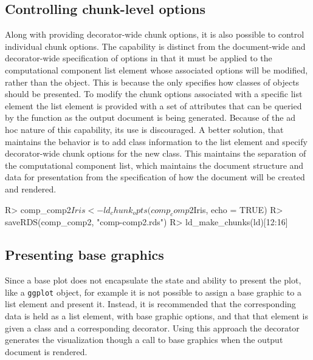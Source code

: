 \documentclass[
]{jss}
\begin{document}
\hypertarget{controlling-chunk-level-options}{%
\subsection{Controlling chunk-level
options}\label{controlling-chunk-level-options}}

Along with providing decorator-wide chunk options, it is also possible
to control individual chunk options. The capability is distinct from the
document-wide and decorator-wide specification of options in that it
must be applied to the computational component list element whose
associated options will be modified, rather than the 
object. This is because the  only specifies how classes
of objects should be presented. To modify the chunk options associated
with a specific list element the list element is provided with a set of
attributes that can be queried by the  function as
the output document is being generated. Because of the ad hoc nature of
this capability, its use is discouraged. A better solution, that
maintains the behavior is to add class information to the list element
and specify decorator-wide chunk options for the new class. This
maintains the separation of the computational component list, which
maintains the document structure and data for presentation from the
specification of how the document will be created and rendered.

\begin{CodeChunk}
\begin{CodeInput}
R> comp_comp2$Iris <- ld_chunk_opts(comp_comp2$Iris, echo = TRUE)
R> saveRDS(comp_comp2, "comp-comp2.rds")
R> ld_make_chunks(ld)[12:16]
\end{CodeInput}
\end{CodeChunk}

\hypertarget{presenting-base-graphics}{%
\subsection{Presenting base graphics}\label{presenting-base-graphics}}

Since a base plot does not encapsulate the state and ability to present
the plot, like a \texttt{ggplot} object, for example it is not possible
to assign a base graphic to a list element and present it. Instead, it
is recommended that the corresponding data is held as a list element,
with base graphic options, and that that element is given a class and a
corresponding decorator. Using this approach the decorator generates the
visualization though a call to base graphics when the output document is
rendered.
\end{document}
